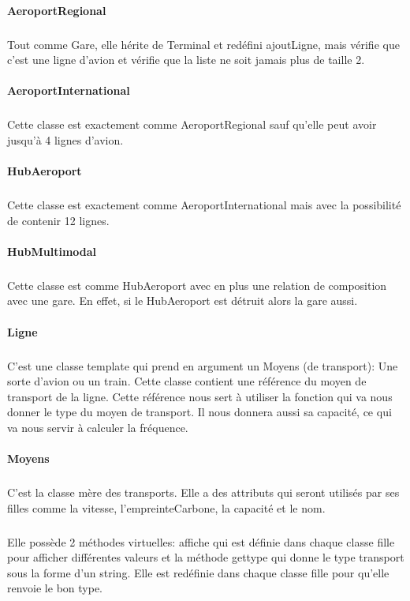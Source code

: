 \documentclass[a4paper]{article}
\begin{document}
\begin{justify}
		\paragraph{AeroportRegional}
		\subparagraph{}Tout comme Gare, elle hérite de Terminal et redéfini ajoutLigne, mais vérifie que c’est une ligne d’avion et vérifie que la liste ne soit jamais plus de taille 2.
		\paragraph{AeroportInternational}
		\subparagraph{}Cette classe est exactement comme AeroportRegional sauf qu’elle peut avoir jusqu’à 4 lignes d’avion.
		\paragraph{HubAeroport}
		\subparagraph{}Cette classe est exactement comme AeroportInternational mais avec la possibilité de contenir 12 lignes.
		\paragraph{HubMultimodal}
		\subparagraph{}Cette classe est comme HubAeroport avec en plus une relation de composition avec une gare. En effet, si le HubAeroport est détruit alors la gare aussi.
		\paragraph{Ligne}
		\subparagraph{}C’est une classe template qui prend en argument un Moyens (de transport): Une sorte d’avion ou un train. Cette classe contient une référence du moyen de transport de la ligne. Cette référence nous sert à utiliser la fonction qui va nous donner le type du moyen de transport. Il nous donnera aussi sa capacité, ce qui va nous servir à calculer la fréquence.
		\paragraph{Moyens}
		\subparagraph{}C’est la classe mère des transports. Elle a des attributs qui seront utilisés par ses filles comme la vitesse, l’empreinteCarbone, la capacité et le nom.\newline
		\subparagraph{}Elle possède 2 méthodes virtuelles: affiche qui est définie dans chaque classe fille pour afficher différentes valeurs et la méthode gettype qui donne le type transport sous la forme d’un string. Elle est redéfinie dans chaque classe fille pour qu’elle renvoie le bon type.


\end{justify}
\end{document}
